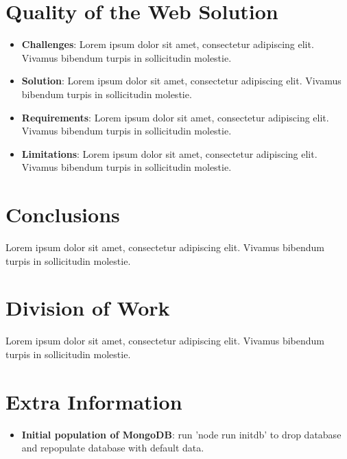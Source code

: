 \documentclass[11pt, a4paper]{article}
\begin{document}
\section{Quality of the Web Solution}
\begin{itemize}
  \item \textbf{Challenges}: Lorem ipsum dolor sit amet, consectetur adipiscing elit. Vivamus
  bibendum turpis in sollicitudin molestie.
  \item \textbf{Solution}: Lorem ipsum dolor sit amet, consectetur adipiscing elit. Vivamus bibendum
  turpis in sollicitudin molestie.
  \item \textbf{Requirements}: Lorem ipsum dolor sit amet, consectetur adipiscing elit. Vivamus
  bibendum turpis in sollicitudin molestie.
  \item \textbf{Limitations}: Lorem ipsum dolor sit amet, consectetur adipiscing elit. Vivamus
  bibendum turpis in sollicitudin molestie.
\end{itemize}

\section{Conclusions}
Lorem ipsum dolor sit amet, consectetur adipiscing elit. Vivamus bibendum turpis in sollicitudin
molestie.

\section{Division of Work}
Lorem ipsum dolor sit amet, consectetur adipiscing elit. Vivamus bibendum turpis in sollicitudin
molestie.

\section{Extra Information}
\begin{itemize}
  \item \textbf{Initial population of MongoDB}: run 'node run initdb' to drop database and repopulate database with default data.
\end{itemize}
\end{document}
